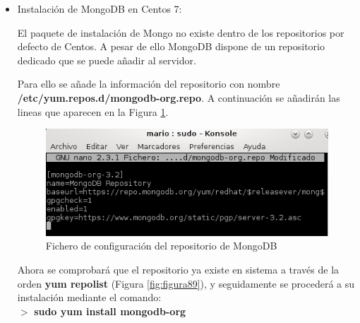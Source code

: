 \begin{itemize}
	\item Instalación de MongoDB en Centos 7:
	
	El paquete de instalación de Mongo no existe dentro de los repositorios por defecto de Centos. A pesar de ello MongoDB dispone de un repositorio dedicado que se puede añadir al servidor.
	
	Para ello se añade la información del repositorio con nombre \textbf{/etc/yum.repos.d/mongodb-org.repo}. A continuación se añadirán las lineas que aparecen en la Figura \ref{fig:figura88}.
	
	\begin{figure}[H] %
		\centering
		\includegraphics[scale=0.5]{figuras/figura88.png} 
		\caption{Fichero de configuración del repositorio de MongoDB} 
		\label{fig:figura88}
	\end{figure}

	Ahora se comprobará que el repositorio ya existe en sistema a través de la orden \textbf{yum repolist} (Figura \ref{fig:figura89}), y seguidamente se procederá a su instalación mediante el comando:
	\\
	
	$ > $ \textbf{sudo yum install mongodb-org}
	

\end{itemize}
